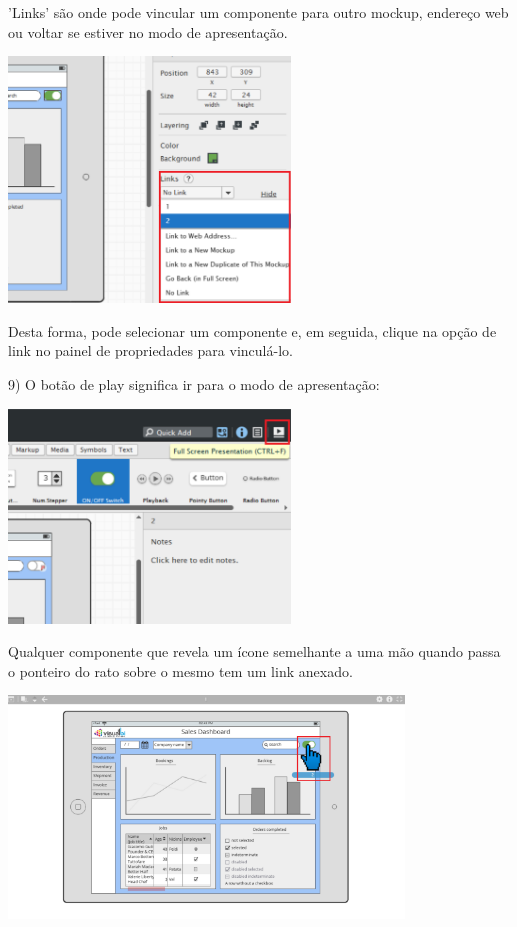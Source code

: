 \documentclass{tufte-book} %
\begin{document}
'Links' são onde pode vincular um componente para outro mockup, endereço web ou voltar se estiver no modo de apresentação.

\begin{center}
	\includegraphics[width=7.50cm]{img19.png}
\end{center}

Desta forma, pode selecionar um componente e, em seguida, clique na opção de link no painel de propriedades para vinculá-lo.

9) O botão de play significa ir para o modo de apresentação:

\begin{center}
	\includegraphics[width=7.50cm]{img20.png}
\end{center}

Qualquer componente que revela um ícone semelhante a uma mão quando passa o ponteiro do rato sobre o mesmo tem um link anexado.

\begin{center}
	\includegraphics[width=10.50cm]{img21.png}
\end{center}
\end{document}
